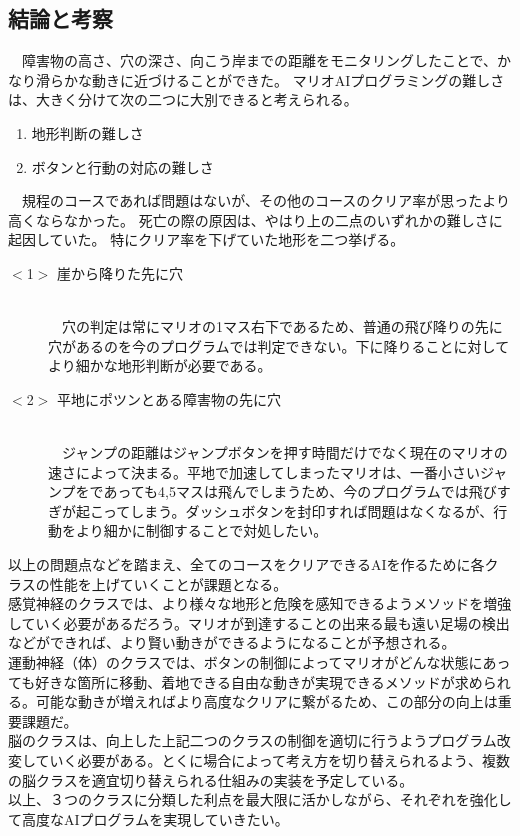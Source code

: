 \documentclass[a4j]{jarticle}
\begin{document}
\subsection{結論と考察}
　障害物の高さ、穴の深さ、向こう岸までの距離をモニタリングしたことで、かなり滑らかな動きに近づけることができた。
マリオAIプログラミングの難しさは、大きく分けて次の二つに大別できると考えられる。
\begin{enumerate}
\item 地形判断の難しさ
\item ボタンと行動の対応の難しさ
\end{enumerate}
　規程のコースであれば問題はないが、その他のコースのクリア率が思ったより高くならなかった。
死亡の際の原因は、やはり上の二点のいずれかの難しさに起因していた。
特にクリア率を下げていた地形を二つ挙げる。
\begin{description}
  \item [$<$1$>$ 崖から降りた先に穴] ~\\
　穴の判定は常にマリオの1マス右下であるため、普通の飛び降りの先に穴があるのを今のプログラムでは判定できない。下に降りることに対してより細かな地形判断が必要である。
　\item[$<$2$>$ 平地にポツンとある障害物の先に穴]~\\
　ジャンプの距離はジャンプボタンを押す時間だけでなく現在のマリオの速さによって決まる。平地で加速してしまったマリオは、一番小さいジャンプをであっても4,5マスは飛んでしまうため、今のプログラムでは飛びすぎが起こってしまう。ダッシュボタンを封印すれば問題はなくなるが、行動をより細かに制御することで対処したい。
\end{description}

以上の問題点などを踏まえ、全てのコースをクリアできるAIを作るために各クラスの性能を上げていくことが課題となる。
\\

感覚神経のクラスでは、より様々な地形と危険を感知できるようメソッドを増強していく必要があるだろう。マリオが到達することの出来る最も遠い足場の検出などができれば、より賢い動きができるようになることが予想される。
\\

運動神経（体）のクラスでは、ボタンの制御によってマリオがどんな状態にあっても好きな箇所に移動、着地できる自由な動きが実現できるメソッドが求められる。可能な動きが増えればより高度なクリアに繋がるため、この部分の向上は重要課題だ。
\\

脳のクラスは、向上した上記二つのクラスの制御を適切に行うようプログラム改変していく必要がある。とくに場合によって考え方を切り替えられるよう、複数の脳クラスを適宜切り替えられる仕組みの実装を予定している。
\\

以上、３つのクラスに分類した利点を最大限に活かしながら、それぞれを強化して高度なAIプログラムを実現していきたい。
\end{document}
